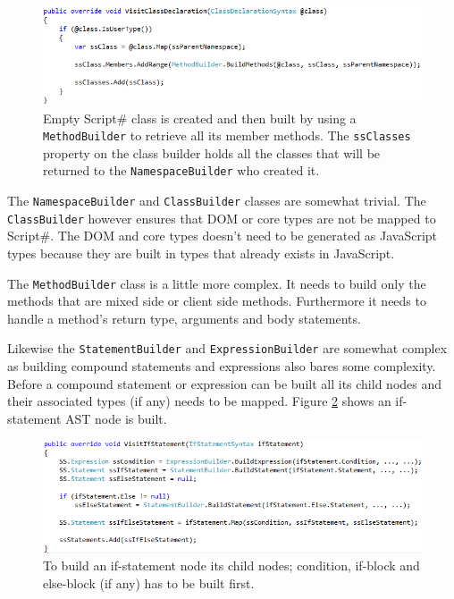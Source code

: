 	\begin{figure}[H]
		\begin{center}
			\centerline{\includegraphics[width=16cm]{resources/images/VisitClassDeclaration.png}}
		\end{center}
		\caption{Empty Script\# class is created and then built by using a \texttt{MethodBuilder} to retrieve all its member methods. The \texttt{ssClasses} property on the class builder holds all the classes that will be returned to the \texttt{NamespaceBuilder} who created it.}
		\label{visitClassDeclaration}
	\end{figure}

	The \texttt{NamespaceBuilder} and \texttt{ClassBuilder} classes are somewhat trivial. The \texttt{ClassBuilder} however ensures that DOM or core types are not be mapped to Script\#. The DOM and core types doesn't need to be generated as JavaScript types because they are built in types that already exists in JavaScript.

	The \texttt{MethodBuilder} class is a little more complex. It needs to build only the methods that are mixed side or client side methods. Furthermore it needs to handle a method’s return type, arguments and body statements. 

	Likewise the \texttt{StatementBuilder} and \texttt{ExpressionBuilder} are somewhat complex as building compound statements and expressions also bares some complexity. Before a compound statement or expression can be built all its child nodes and their associated types (if any) needs to be mapped. Figure \ref{visitIfStatement} shows an if-statement AST node is built.

	\begin{figure}[H]
		\begin{center}
			\centerline{\includegraphics[width=16cm]{resources/images/VisitIfStatement.png}}
		\end{center}
		\caption{To build an if-statement node its child nodes; condition, if-block and else-block (if any) has to be built first.}
		\label{visitIfStatement}
	\end{figure}

